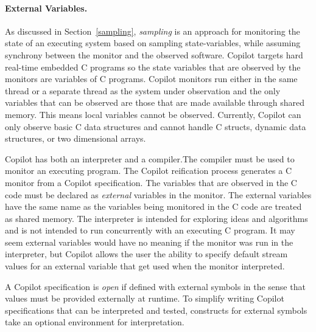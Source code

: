 \paragraph{External Variables.}


As discussed in Section~\ref{sampling}, \emph{sampling} is an approach 
for  monitoring the state of an  executing system  based on 
sampling state-variables, while assuming synchrony between the monitor and 
the observed software. Copilot targets hard real-time embedded C
programs so the state variables that are observed by the monitors
are variables of C programs. Copilot monitors  run either in the
same thread or a separate thread as the system under observation 
and the only variables that can be
observed are those that are made available through shared memory. This
means local variables cannot  be observed. Currently, Copilot can only
observe basic C data structures and cannot handle C
structs, dynamic data structures, or  two dimensional arrays. 


Copilot has both an interpreter and a compiler.The compiler must be
used to monitor an
executing program. The Copilot reification process generates a C
monitor from a Copilot specification. The variables that are observed
in the C code must be declared as \emph{external} variables in the
monitor. The external variables have the same name as the variables
being monitored in the C code are treated as shared memory. The
interpreter is intended for exploring ideas and algorithms and is not
intended to run concurrently with an executing C program. It may seem
external variables would have no meaning if the monitor was run in the
interpreter, but Copilot allows the user the ability to specify
default stream values for an external variable that get used when the
monitor interpreted. 

 A Copilot specification is \emph{open} if defined with external symbols in the
sense that values must be provided externally at runtime.  To simplify writing
Copilot specifications that can be interpreted and tested, constructs for
external symbols take an optional environment for interpretation.

